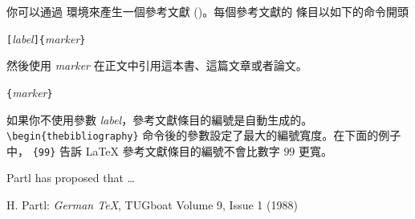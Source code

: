 
你可以通過  環境來產生一個參考文獻 ()。每個參考文獻的
條目以如下的命令開頭
  \begin{lscommand}
    \verb|[|\emph{label}\verb|]{|\emph{marker}\verb|}|
  \end{lscommand}
然後使用 \emph{marker} 在正文中引用這本書、這篇文章或者論文。
  \begin{lscommand}
    \verb|{|\emph{marker}\verb|}|
  \end{lscommand}
如果你不使用參數 \emph{label}，參考文獻條目的編號是自動生成的。 \verb|\begin{thebibliography}| 
命令後的參數設定了最大的編號寬度。在下面的例子中， \verb|{99}| 告訴
 \LaTeX{} 參考文獻條目的編號不會比數字 $99$ 更寬。
 \begin{example}
 Partl \cite{pa} has
 proposed that \ldots
 \begin{thebibliography}{99}
  H. Partl:
 \emph{German \TeX},
 TUGboat Volume 9, Issue 1
  (1988)
 \end{thebibliography}
 \end{example}

\thispagestyle{fancyplain}

